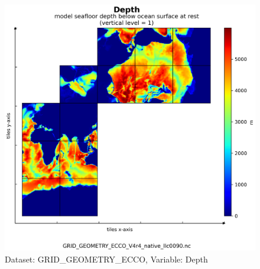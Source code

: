 \begin{figure}[H]
\centering
\includegraphics[scale=0.55]{../images/plots/v4r4/native_plots_coords/Geometry_Parameters_for_the_Lat-Lon-Cap_90_(llc90)_Native_Model_Grid_(Version_4_Release_4)/Depth.png}
\caption{Dataset: GRID\_GEOMETRY\_ECCO, Variable: Depth}
\label{tab:table-GRID_GEOMETRY_ECCO_Depth-Plot}
\end{figure}
\newpage
\pagebreak
